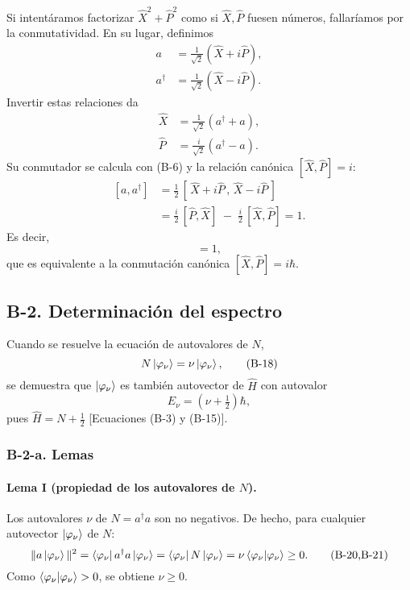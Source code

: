 \documentclass[a4paper,11pt]{article}
\begin{document}
Si intentáramos factorizar \(\hat X^2 + \hat P^2\) como si \(\hat X,\hat P\) fuesen números, fallaríamos por la conmutatividad. En su lugar, definimos
\begin{align}
a        &= \tfrac{1}{\sqrt2}(\hat X + i\hat P),
\tag{B-6a}\\
a^\dagger&= \tfrac{1}{\sqrt2}(\hat X - i\hat P).
\tag{B-6b}
\end{align}
Invertir estas relaciones da
\begin{align}
\hat X &= \tfrac{1}{\sqrt2}(a^\dagger + a),
\tag{B-7a}\\
\hat P &= \tfrac{i}{\sqrt2}(a^\dagger - a).
\tag{B-7b}
\end{align}
Su conmutador se calcula con (B-6) y la relación canónica \([\hat X,\hat P]=i\):
\begin{equation}
\begin{split}
[a,a^\dagger]
&= \tfrac12\,[\,\hat X + i\hat P\,,\,\hat X - i\hat P\,]\\
&= \tfrac{i}{2}\,[\hat P,\hat X] \;-\;\tfrac{i}{2}\,[\hat X,\hat P]
=1.
\end{split}
\tag{B-8}
\end{equation}
Es decir,
\begin{equation}
[a,a^\dagger]=1,
\tag{B-9}
\end{equation}
que es equivalente a la conmutación canónica \([\hat X,\hat P]=i\hbar\).

\subsection*{B-2. Determinación del espectro}

Cuando se resuelve la ecuación de autovalores de \(N\),
\[
N\ket{\varphi_\nu}=\nu\ket{\varphi_\nu},
\tag{B-18}
\]
se demuestra que \(\ket{\varphi_\nu}\) es también autovector de \(\hat H\) con autovalor
\[
E_\nu=(\nu+\tfrac12)\hbar,
\tag{B-19}
\]
pues \(\hat H=N+\tfrac12\) [Ecuaciones (B-3) y (B-15)].

\subsubsection*{B-2-a. Lemas}

\paragraph{Lema I (propiedad de los autovalores de \(N\)).}  
Los autovalores \(\nu\) de \(N=a^\dagger a\) son no negativos.  
De hecho, para cualquier autovector \(\ket{\varphi_\nu}\) de \(N\):
\[
\|a\ket{\varphi_\nu}\|^2
=\bra{\varphi_\nu}a^\dagger a\ket{\varphi_\nu}
=\bra{\varphi_\nu}N\ket{\varphi_\nu}
=\nu\braket{\varphi_\nu|\varphi_\nu}\ge0.
\tag{B-20,B-21}
\]
Como \(\braket{\varphi_\nu|\varphi_\nu}>0\), se obtiene \(\nu\ge0\).
  
\end{document}
